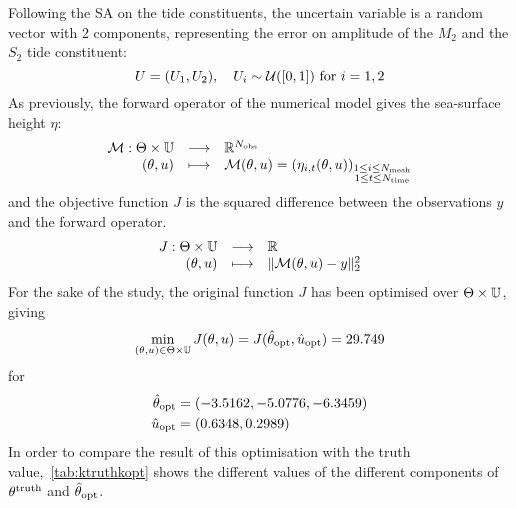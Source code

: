 \documentclass[../../Main_ManuscritThese.tex]{subfiles}
\begin{document}


Following the SA on the tide constituents, the uncertain variable is a
random vector with \num{2} components, representing the error on
amplitude of the $M_2$ and the $S_2$ tide constituent:
\begin{equation}
  \UU = (\UU_1,\UU_2), \quad \UU_i \sim \mathcal{U}(\interval{0}{1}) \text{ for } i=1,2
\end{equation}
As previously, the forward operator of the numerical model gives the sea-surface height $\eta$:
\begin{equation}
  \begin{array}{rcl}
    \mathcal{M}: \Kspace \times \Uspace &\longrightarrow& \mathbb{R}^{N_{\mathrm{obs}}} \\
    (\kk, \uu)& \longmapsto & \mathcal{M}(\kk, \uu) = \left(\eta_{i,t}(\kk, \uu)\right)_{\substack{1 \leq i \leq N_{\mathrm{mesh}} \\ 1 \leq t \leq N_{\mathrm{time}}}} \\ 
  \end{array}
\end{equation}
and the objective function $J$ is the squared difference between the
observations $y$ and the forward operator.
\begin{equation}
  \begin{array}{rcl}
    J: \Kspace \times \Uspace & \longrightarrow & \mathbb{R} \\
    (\kk, \uu) & \longmapsto & \|\mathcal{M}(\kk, \uu) - y \|^2_2
  \end{array}
\end{equation}
For the sake of the study, the original function $J$ has been
optimised over $\Kspace\times\Uspace$, giving
\begin{equation}
  \min_{(\kk,\uu) \in \Kspace \times \Uspace} J(\kk, \uu) = J(\hat{\kk}_{\mathrm{opt}}, \hat{\uu}_{\mathrm{opt}})= \num{29.749}
\end{equation}
for
\begin{align}
  \hat{\kk}_{\mathrm{opt}}                     & = (\num[round-mode=places,round-precision=4]{-3.5161661} , \num[round-mode=places,round-precision=4]{-5.07764701}, \num[round-mode=places,round-precision=4]{-6.34588442})                                                                                                            \\\hat{\uu}_{\mathrm{opt}} & = (\num[round-mode=places,round-precision=4]{0.6347829},\num[round-mode=places,round-precision=4]{0.29890637})
\end{align}
In order to compare the result of this optimisation with the truth
value,~\cref{tab:ktruthkopt} shows the different values of the
different components of $\kk^{\mathrm{truth}}$ and
$\hat{\kk}_{\mathrm{opt}}$.
\end{document}
